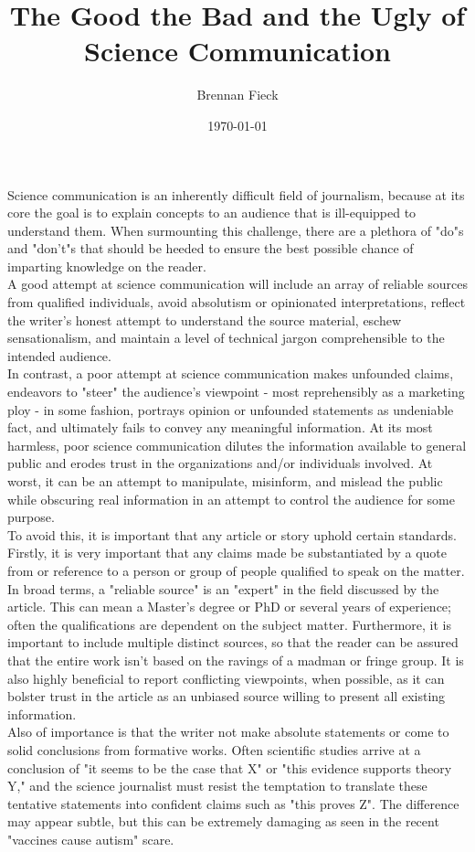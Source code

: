 \documentclass[12pt]{article}
\author{Brennan Fieck}
\title{The Good the Bad and the Ugly of Science Communication}
\date{\today}
\begin{document}
\maketitle

Science communication is an inherently difficult field of journalism, because at its core the goal is to explain concepts to an audience that is ill-equipped to understand them. When surmounting this challenge, there are a plethora of "do"s and "don't"s that should be heeded to ensure the best possible chance of imparting knowledge on the reader.\\
\indent A good attempt at science communication will include an array of reliable sources from qualified individuals, avoid absolutism or opinionated interpretations, reflect the writer's honest attempt to understand the source material, eschew sensationalism, and maintain a level of technical jargon comprehensible to the intended audience.\\
\indent In contrast, a poor attempt at science communication makes unfounded claims, endeavors to "steer" the audience's viewpoint - most reprehensibly as a marketing ploy - in some fashion, portrays opinion or unfounded statements as undeniable fact, and ultimately fails to convey any meaningful information. At its most harmless, poor science communication dilutes the information available to general public and erodes trust in the organizations and/or individuals involved. At worst, it can be an attempt to manipulate, misinform, and mislead the public while obscuring real information in an attempt to control the audience for some purpose.\\
\indent To avoid this, it is important that any article or story uphold certain standards. Firstly, it is very important that any claims made be substantiated by a quote from or reference to a person or group of people qualified to speak on the matter. In broad terms, a "reliable source" is an "expert" in the field discussed by the article. This can mean a Master's degree or PhD or several years of experience; often the qualifications are dependent on the subject matter. Furthermore, it is important to include multiple distinct sources, so that the reader can be assured that the entire work isn't based on the ravings of a madman or fringe group. It is also highly beneficial to report conflicting viewpoints, when possible, as it can bolster trust in the article as an unbiased source willing to present all existing information.\\
\indent Also of importance is that the writer not make absolute statements or come to solid conclusions from formative works. Often scientific studies arrive at a conclusion of "it seems to be the case that X" or "this evidence supports theory Y," and the science journalist must resist the temptation to translate these tentative statements into confident claims such as "this proves Z". The difference may appear subtle, but this can be extremely damaging as seen in the recent "vaccines cause autism" scare.\\
\end{document}
